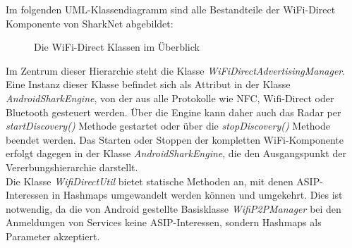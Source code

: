 Im folgenden UML-Klassendiagramm sind alle Bestandteile der WiFi-Direct Komponente von SharkNet abgebildet:
\begin{figure}[H]
	\centering
	\caption{Die WiFi-Direct Klassen im Überblick}
	\label{fig:wifiAll}
\end{figure}
\newpage
Im Zentrum dieser Hierarchie steht die Klasse \textit{WiFiDirectAdvertisingManager}. Eine Instanz dieser Klasse befindet sich als Attribut in der Klasse \textit{AndroidSharkEngine}, von der aus alle Protokolle wie NFC, Wifi-Direct oder Bluetooth gesteuert werden. Über die Engine kann daher auch das Radar per \textit{startDiscovery()} Methode gestartet oder über die \textit{stopDiscovery()} Methode beendet werden. Das Starten oder Stoppen der kompletten WiFi-Komponente erfolgt dagegen in der Klasse \textit{AndroidSharkEngine}, die den Ausgangspunkt der Vererbungshierarchie darstellt.
\\Die Klasse \textit{WifiDirectUtil} bietet statische Methoden an, mit denen ASIP-Interessen in Hashmaps umgewandelt werden können und umgekehrt. Dies ist notwendig, da die von Android gestellte Basisklasse \textit{WifiP2PManager} bei den Anmeldungen von Services keine ASIP-Interessen, sondern Hashmaps als Parameter akzeptiert.

